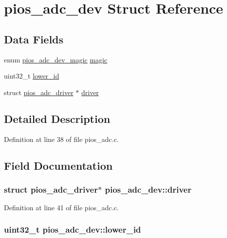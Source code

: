 \hypertarget{structpios__adc__dev}{\section{pios\-\_\-adc\-\_\-dev \-Struct \-Reference}
\label{structpios__adc__dev}
}
\subsection*{\-Data \-Fields}
\begin{DoxyCompactItemize}
\item 
enum \hyperlink{group___p_i_o_s___a_d_c_gad4639b786d45b213ac842a0c4cf3e78d}{pios\-\_\-adc\-\_\-dev\-\_\-magic} \hyperlink{structpios__adc__dev_ab066aa96f4656e2fbac6a1a9edc593fc}{magic}
\item 
uint32\-\_\-t \hyperlink{structpios__adc__dev_aa77f358fd46e447f8059a7d9497f7445}{lower\-\_\-id}
\item 
struct \hyperlink{structpios__adc__driver}{pios\-\_\-adc\-\_\-driver} $\ast$ \hyperlink{structpios__adc__dev_af5422f0c1feb2792ce2cdb584ad0331e}{driver}
\end{DoxyCompactItemize}


\subsection{\-Detailed \-Description}


\-Definition at line 38 of file pios\-\_\-adc.\-c.



\subsection{\-Field \-Documentation}
\hypertarget{structpios__adc__dev_af5422f0c1feb2792ce2cdb584ad0331e}{
\subsubsection[{driver}]{\setlength{\rightskip}{0pt plus 5cm}struct {\bf pios\-\_\-adc\-\_\-driver}$\ast$ {\bf pios\-\_\-adc\-\_\-dev\-::driver}}}\label{structpios__adc__dev_af5422f0c1feb2792ce2cdb584ad0331e}


\-Definition at line 41 of file pios\-\_\-adc.\-c.

\hypertarget{structpios__adc__dev_aa77f358fd46e447f8059a7d9497f7445}{
\subsubsection[{lower\-\_\-id}]{\setlength{\rightskip}{0pt plus 5cm}uint32\-\_\-t {\bf pios\-\_\-adc\-\_\-dev\-::lower\-\_\-id}}}\label{structpios__adc__dev_aa77f358fd46e447f8059a7d9497f7445}


